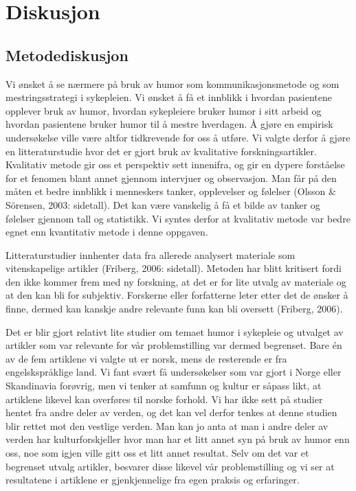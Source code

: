 \chapter{Diskusjon}

\section{Metodediskusjon}

Vi ønsket å se nærmere på bruk av humor som kommunikasjonsmetode og som
mestringsstrategi i sykepleien. Vi ønsket å få et innblikk i hvordan pasientene
opplever bruk av humor, hvordan sykepleiere bruker humor i sitt arbeid og
hvordan pasientene bruker humor til å mestre hverdagen. Å gjøre en empirisk
undersøkelse ville være altfor tidkrevende for oss å utføre. Vi valgte derfor å
gjøre en litteraturstudie hvor det er gjort bruk av kvalitative
forskningsartikler. Kvalitativ metode gir oss et perspektiv sett innenifra, og
gir en dypere forståelse for et fenomen blant annet gjennom intervjuer og
observasjon. Man får på den måten et bedre innblikk i menneskers tanker,
opplevelser og følelser (Olsson \&{} Sörensen, 2003: sidetall). Det kan være
vanskelig å få et bilde av tanker og følelser gjennom tall og statistikk. Vi
syntes derfor at kvalitativ metode var bedre egnet enn kvantitativ metode i
denne oppgaven.

Litteraturstudier innhenter data fra allerede analysert materiale som
vitenskapelige artikler (Friberg, 2006: sidetall). Metoden har blitt kritisert
fordi den ikke kommer frem med ny forskning, at det er for lite utvalg av
materiale og at den kan bli for subjektiv. Forskerne eller forfatterne leter
etter det de ønsker å finne, dermed kan kanskje andre relevante funn kan bli
oversett (Friberg, 2006).

Det er blir gjort relativt lite studier om temaet humor i sykepleie og utvalget
av artikler som var relevante for vår problemstilling var dermed begrenset.
Bare én av de fem artiklene vi valgte ut er norsk, mens de resterende er fra
engelskspråklige land. Vi fant svært få undersøkelser som var gjort i Norge
eller Skandinavia forøvrig, men vi tenker at samfunn og kultur er såpass likt,
at artiklene likevel kan overføres til norske forhold. Vi har ikke sett på
studier hentet fra andre deler av verden, og det kan vel derfor tenkes at denne
studien blir rettet mot den vestlige verden. Man kan jo anta at man i andre
deler av verden har kulturforskjeller hvor man har et litt annet syn på bruk av
humor enn oss, noe som igjen ville gitt oss et litt annet resultat. Selv om det
var et begrenset utvalg artikler, besvarer disse likevel vår problemstilling og
vi ser at resultatene i artiklene er gjenkjennelige fra egen praksis og
erfaringer.

